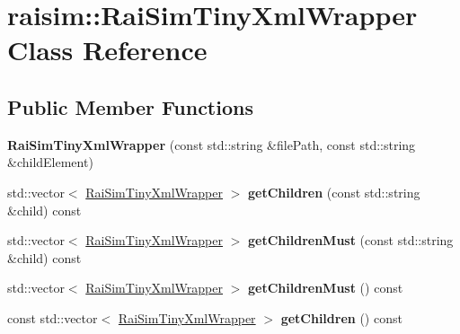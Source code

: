\hypertarget{classraisim_1_1RaiSimTinyXmlWrapper}{}\section{raisim\+:\+:Rai\+Sim\+Tiny\+Xml\+Wrapper Class Reference}
\label{classraisim_1_1RaiSimTinyXmlWrapper}
\subsection*{Public Member Functions}
\begin{DoxyCompactItemize}
\item 
\mbox{\label{classraisim_1_1RaiSimTinyXmlWrapper_a9889b177b8055b5becd5a881a467dd93}} 
{\bfseries Rai\+Sim\+Tiny\+Xml\+Wrapper} (const std\+::string \&file\+Path, const std\+::string \&child\+Element)
\item 
\mbox{\label{classraisim_1_1RaiSimTinyXmlWrapper_a9fc4569adcf07402aa57a5ac6f74ec9f}} 
std\+::vector$<$ \hyperlink{classraisim_1_1RaiSimTinyXmlWrapper}{Rai\+Sim\+Tiny\+Xml\+Wrapper} $>$ {\bfseries get\+Children} (const std\+::string \&child) const
\item 
\mbox{\label{classraisim_1_1RaiSimTinyXmlWrapper_a3cd7357eb5609504b63ab72bb08ee831}} 
std\+::vector$<$ \hyperlink{classraisim_1_1RaiSimTinyXmlWrapper}{Rai\+Sim\+Tiny\+Xml\+Wrapper} $>$ {\bfseries get\+Children\+Must} (const std\+::string \&child) const
\item 
\mbox{\label{classraisim_1_1RaiSimTinyXmlWrapper_a9454b25f6a6cdb973f3686aa2545872c}} 
std\+::vector$<$ \hyperlink{classraisim_1_1RaiSimTinyXmlWrapper}{Rai\+Sim\+Tiny\+Xml\+Wrapper} $>$ {\bfseries get\+Children\+Must} () const
\item 
\mbox{\label{classraisim_1_1RaiSimTinyXmlWrapper_a5be75338ffe2060f03e10b4c40556e83}} 
const std\+::vector$<$ \hyperlink{classraisim_1_1RaiSimTinyXmlWrapper}{Rai\+Sim\+Tiny\+Xml\+Wrapper} $>$ {\bfseries get\+Children} () const
\item 
\mbox{\label{classraisim_1_1RaiSimTinyXmlWrapper_a41483685d1df656ddfc29aeb014ec4fd}} 

\end{DoxyCompactItemize}
